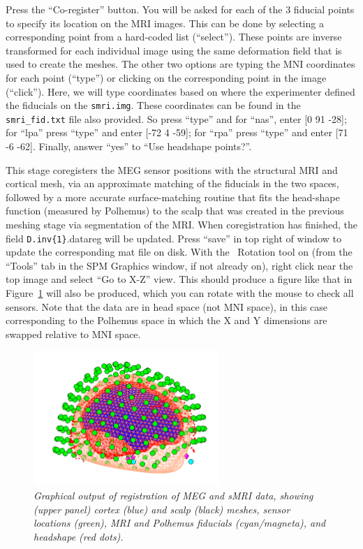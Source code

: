 Press the ``Co-register'' button. You will be asked for each of the 3 fiducial points to specify its location on the MRI images. This can be done by selecting a corresponding point from a hard-coded list (``select''). These points are inverse transformed for each individual image using the same deformation field that is used to create the meshes. The other two options are typing the MNI coordinates for each point (``type'') or clicking on the corresponding point in the image (``click''). Here, we will type coordinates based on where the experimenter defined the fiducials on the \texttt{smri.img}. These coordinates can be found in the \texttt{smri\_fid.txt} file also provided. So press ``type'' and for ``nas'', enter [0  91  -28]; for ``lpa'' press ``type'' and enter [-72   4  -59]; for ``rpa'' press ``type'' and enter [71  -6  -62]. Finally, answer ``yes'' to ``Use headshape points?''.

This stage coregisters the MEG sensor positions with the structural MRI and cortical mesh, via an approximate matching of the fiducials in the two spaces, followed by a more accurate surface-matching routine that fits the head-shape function (measured by Polhemus) to the scalp that was created in the previous meshing stage via segmentation of the MRI. When coregistration has finished, the field \texttt{D.inv\{1\}}.datareg will be updated. Press ``save'' in top right of window to update the corresponding mat file on disk. With the \matlab\ Rotation tool on (from the ``Tools'' tab in the SPM Graphics window, if not already on), right click near the top image and select ``Go to X-Z'' view. This should produce a figure like that in Figure~\ref{multimodal:fig:17} will also be produced, which you can rotate with the mouse to check all sensors. Note that the data are in head space (not MNI space), in this case corresponding to the Polhemus space in which the X and Y dimensions are swapped relative to MNI space.

\begin{figure}
\begin{center}
\includegraphics[width=70mm]{multimodal/figures/meg_coreg.png}
\caption{\em  Graphical output of registration of MEG and sMRI data, showing (upper panel) cortex (blue) and scalp (black) meshes, sensor locations (green), MRI and Polhemus fiducials (cyan/magneta), and headshape (red dots).\label{multimodal:fig:17}}
\end{center}
\end{figure}

